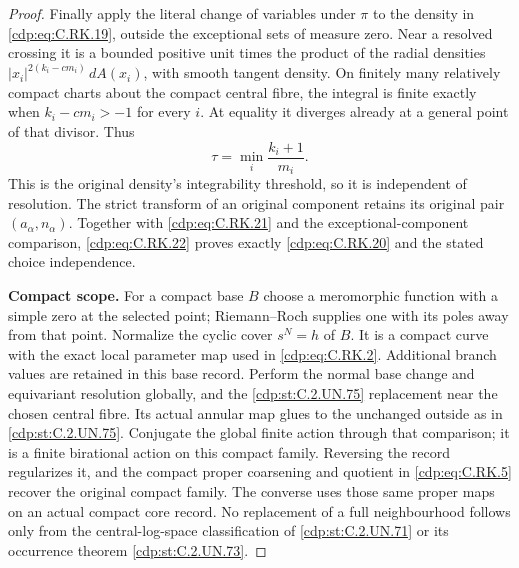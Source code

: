 \begin{proof}
Finally apply the literal change
of variables under $\pi$ to the
density in \eqref{cdp:eq:C.RK.19}, outside
the exceptional sets of measure
zero. Near a resolved crossing
it is a bounded positive unit
times the product of the radial
densities
$|x_i|^{2(k_i-cm_i)}\,dA(x_i)$,
with smooth tangent density.
On finitely many relatively
compact charts about the compact
central fibre, the integral is
finite exactly when
$k_i-cm_i>-1$ for every $i$.
At equality it diverges already
at a general point of that
divisor. Thus
\[
                             \tau=\min_i\frac{k_i+1}{m_i}.
\tag{C.RK.22}\label{cdp:eq:C.RK.22}
\]
This is the original density's
integrability threshold, so it
is independent of resolution.
The strict transform of an
original component retains
its original pair
$(a_\alpha,n_\alpha)$.
Together with \eqref{cdp:eq:C.RK.21} and the
exceptional-component comparison,
\eqref{cdp:eq:C.RK.22} proves exactly
\eqref{cdp:eq:C.RK.20} and the stated
choice independence.

\par\medskip\noindent\textbf{Compact scope.}
For a compact base $B$ choose
a meromorphic function with
a simple zero at the selected
point; Riemann--Roch supplies
one with its poles away from
that point. Normalize the
cyclic cover $s^N=h$ of $B$.
It is a compact curve with
the exact local parameter
map used in \eqref{cdp:eq:C.RK.2}.
Additional branch values
are retained in this base
record. Perform the normal
base change and equivariant
resolution globally, and
the \ref{cdp:st:C.2.UN.75} replacement near
the chosen central fibre.
Its actual annular map
glues to the unchanged
outside as in \ref{cdp:st:C.2.UN.75}. Conjugate
the global finite action
through that comparison;
it is a finite birational
action on this compact
family. Reversing the
record regularizes it,
and the compact proper
coarsening and quotient
in \eqref{cdp:eq:C.RK.5} recover the
original compact family.
The converse uses those
same proper maps on an
actual compact core record.
No replacement of a full
neighbourhood follows only
from the central-log-space
classification of \ref{cdp:st:C.2.UN.71}
or its occurrence theorem
\ref{cdp:st:C.2.UN.73}.
\end{proof}


